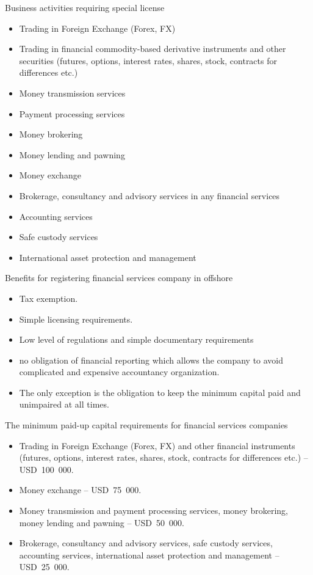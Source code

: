 \documentclass[international_finance_p2.tex]{subfiles}
\begin{document}
\begin{frame}[shrink=10]{Business activities requiring special license}
\begin{itemize}
\item
    Trading in Foreign Exchange (Forex, FX)
\item
    Trading in financial commodity-based derivative instruments and other securities (futures, options, interest rates, shares, stock, contracts for differences etc.)
\item
    Money transmission services
\item
    Payment processing services
\item
    Money brokering
\item
    Money lending and pawning
\item
    Money exchange
\item
    Brokerage, consultancy and advisory services in any financial services
\item
    Accounting services
\item
    Safe custody services
\item
    International asset protection and management
\end{itemize}
\end{frame}
\begin{frame}{Benefits for registering financial services company in offshore}
\begin{itemize}[<+->]
\item
Tax exemption.
\item
Simple licensing requirements.
\item
Low level of regulations and simple documentary requirements 
\item
no obligation of financial reporting which allows the company to avoid complicated and expensive accountancy organization. 
\item
The only exception is the obligation to keep the minimum capital paid and unimpaired at all times. 
\end{itemize}
\end{frame}
\begin{frame}{The minimum paid-up capital requirements for financial services companies}
\begin{itemize}
\item
Trading in Foreign Exchange (Forex, FX) and other financial instruments (futures, options, interest rates, shares, stock, contracts for differences etc.) – USD~100~000.
\item
Money exchange – USD~75~000.
\item
Money transmission and payment processing services, money brokering, money lending and pawning – USD~50~000.
\item
Brokerage, consultancy and advisory services, safe custody services, accounting services, international asset protection and management – USD~25~000.

\end{itemize}
\end{frame}
\end{document}
